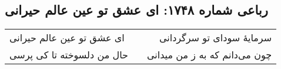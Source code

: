 \begin{center}
\section*{رباعی شماره ۱۷۴۸: ای عشق تو عین عالم حیرانی}
\label{sec:1748}
\begin{longtable}{l p{0.5cm} r}
ای عشق تو عین عالم حیرانی
&&
سرمایهٔ سودای تو سرگردانی
\\
حال من دلسوخته تا کی پرسی
&&
چون می‌دانم که به ز من میدانی
\\
\end{longtable}
\end{center}
